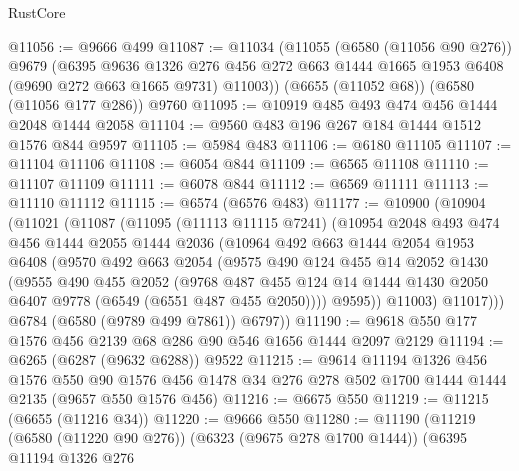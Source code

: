 \begin{lexlean}{RustCore}
\begin{coremodule}
{\begin{coremodule}
{{{{{{{{{{{{{{{{{{{{{{{{{{{{{{{{{{{{{{{{{{{{{@11056 := @9666 @499
@11087 := @11034
    (@11055
      (@6580 (@11056 @90 @276))
      @9679
      (@6395
        @9636
        @1326
        @276
        @456
        @272
        @663
        @1444
        @1665
        @1953
        @6408
        (@9690 @272 @663 @1665 @9731)
        @11003))
    (@6655 (@11052 @68))
    (@6580 (@11056 @177 @286))
    @9760
@11095 := @10919 @485 @493 @474 @456 @1444 @2048 @1444 @2058
@11104 := @9560 @483 @196 @267 @184 @1444 @1512 @1576 @844 @9597
@11105 := @5984 @483
@11106 := @6180 @11105
@11107 := @11104 @11106
@11108 := @6054 @844
@11109 := @6565 @11108
@11110 := @11107 @11109
@11111 := @6078 @844
@11112 := @6569 @11111
@11113 := @11110 @11112
@11115 := @6574 (@6576 @483)
@11177 := @10900
    (@10904
      (@11021
        (@11087
          (@11095
            (@11113 @11115 @7241)
            (@10954
              @2048
              @493
              @474
              @456
              @1444
              @2055
              @1444
              @2036
              (@10964
                @492
                @663
                @1444
                @2054
                @1953
                @6408
                (@9570
                  @492
                  @663
                  @2054
                  (@9575
                    @490
                    @124
                    @455
                    @14
                    @2052
                    @1430
                    (@9555
                      @490
                      @455
                      @2052
                      (@9768
                        @487
                        @455
                        @124
                        @14
                        @1444
                        @1430
                        @2050
                        @6407
                        @9778
                        (@6549 (@6551 @487 @455 @2050))))
                    @9595))
                @11003)
              @11017)))
        @6784
        (@6580 (@9789 @499 @7861))
        @6797))
@11190 := @9618 @550 @177 @1576 @456 @2139 @68 @286 @90 @546 @1656 @1444 @2097 @2129
@11194 := @6265 (@6287 (@9632 @6288)) @9522
@11215 := @9614
    @11194
    @1326
    @456
    @1576
    @550
    @90
    @1576
    @456
    @1478
    @34
    @276
    @278
    @502
    @1700
    @1444
    @1444
    @2135
    (@9657 @550 @1576 @456)
@11216 := @6675 @550
@11219 := @11215 (@6655 (@11216 @34))
@11220 := @9666 @550
@11280 := @11190
    (@11219
      (@6580 (@11220 @90 @276))
      (@6323 (@9675 @278 @1700 @1444))
      (@6395
        @11194
        @1326
        @276
}}}}}}}}}}}}}}}}}}}}}}}}}}}}}}}}}}}}}}}}}}}}}
\end{coremodule}}
\end{coremodule}
\end{lexlean}
